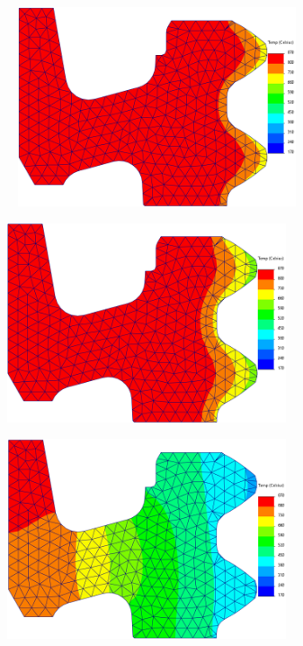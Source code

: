 \begin{figure}[htb]
    \centering
    \begin{subfigure}{.33\textwidth}\
        \centering
        \includegraphics[width = 0.9\textwidth]{Figures/Cap4/Ac3(dentado).png}
        \caption[]%
        {}
        \label{fig:A3_Dent}
    \end{subfigure}%
    \begin{subfigure}{.33\textwidth}
        \centering
        \includegraphics[width = 0.9\textwidth]{Figures/Cap4/Ac1(dentado).png}
        \caption{}
        \label{fig:A1_Dent}
    \end{subfigure}
    \begin{subfigure}{.33\textwidth}
        \centering
        \includegraphics[width = 0.9\textwidth]{Figures/Cap4/Ms(dentado).png}

\end{subfigure}
\end{figure}
